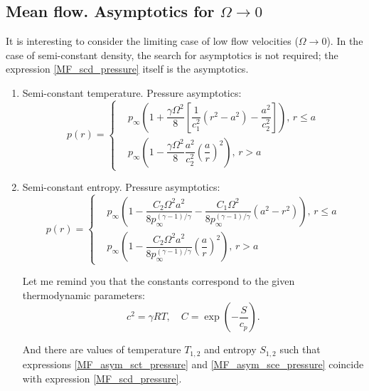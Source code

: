 \subsection{Mean flow. Asymptotics for $\Omega \rightarrow 0$}

It is interesting to consider the limiting case of low flow velocities ($\Omega \rightarrow 0$). In the case of semi-constant density, the search for asymptotics is not required; the expression \eqref{MF_scd_pressure} itself is the asymptotics. 
\begin{enumerate}
	\item Semi-constant temperature. Pressure asymptotics:
	\begin{equation}
		\label{MF_asym_sct_pressure}
		p(r) = \left\{
		\begin{aligned}
			& p_{\infty} \left(1 + \dfrac{\gamma \Omega^2}{8}\left[\dfrac{1}{c_1^2}(r^2 - a^2) - \dfrac{a^2}{c_2^2}\right]\right), \, r \leqslant a \\
			& p_{\infty} \left(1 - \dfrac{\gamma \Omega^2}{8} \dfrac{a^2}{c_2^2}\left(\dfrac{a}{r}\right)^2\right), \, r > a
		\end{aligned}
		\right.
	\end{equation}
	\item Semi-constant entropy. Pressure asymptotics:
	\begin{equation}
		\label{MF_asym_sce_pressure}
		p(r) = \left\{
		\begin{aligned}
			& p_{\infty} \left(1 - \dfrac{C_2\Omega^2 a^2}{8p_{\infty}^{(\gamma-1)/\gamma}} - \dfrac{C_1\Omega^2}{8p_{\infty}^{(\gamma-1)/\gamma}}(a^2 - r^2)\right), \, r \leqslant a \\
			& p_{\infty} \left(1 - \dfrac{C_2\Omega^2 a^2}{8p_{\infty}^{(\gamma-1)/\gamma}} \left(\dfrac{a}{r}\right)^2\right), \, r > a
		\end{aligned}
		\right.
	\end{equation}

Let me remind you that the constants correspond to the given thermodynamic parameters:
\begin{equation}
	c^2 = \gamma R T, \quad C = \exp\left(-\dfrac{S}{c_p}\right).
\end{equation}

And there are values of temperature $T_{1,2}$ and entropy $S_{1,2}$ such that expressions \eqref{MF_asym_sct_pressure} and \eqref{MF_asym_sce_pressure} coincide with expression \eqref{MF_scd_pressure}.
\end{enumerate}